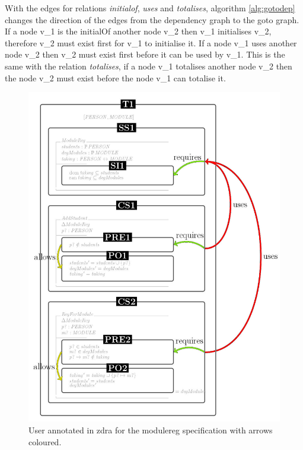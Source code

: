 With the edges for relations \emph{initialof}, \emph{uses} and \emph{totalises},
algorithm \ref{alg:gotodep} changes the direction of the edges from the
dependency graph to the goto graph. If a node v\_1 is the initialOf another node
v\_2 then v\_1 initialises v\_2, therefore v\_2 must exist first for v\_1 to
initialise it. If a node v\_1 uses another node v\_2 then v\_2 must exist first
before it can be used by v\_1. This is the same with the relation
\emph{totalises}, if a node v\_1 totalises another node v\_2 then the node v\_2
must exist before the node v\_1 can totalise it.

\begin{figure}[H]
\centering
\includegraphics[scale=0.7]{Figures/Formalising/dramodule.png}
\caption{User annotated in \gls{zdra} for the modulereg specification with arrows coloured. \label{fig:zdramodule}}
\end{figure}

